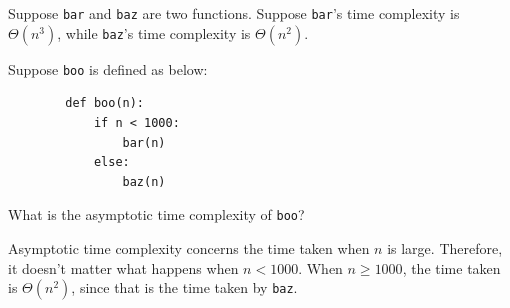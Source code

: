 \begin{prob}
    Suppose \texttt{bar} and \texttt{baz} are two functions.
    Suppose \texttt{bar}'s time complexity is $\Theta(n^3)$, while \texttt{baz}'s
    time complexity is $\Theta(n^2)$.

    Suppose \texttt{boo} is defined as below:

    \begin{verbatim}
        def boo(n):
            if n < 1000:
                bar(n)
            else:
                baz(n)
    \end{verbatim}

    What is the asymptotic time complexity of \texttt{boo}?


    \begin{soln}
        Asymptotic time complexity concerns the time taken when $n$ is large.
        Therefore, it doesn't matter what happens when $n < 1000$.
        When $n \geq 1000$, the time taken is $\Theta(n^2)$, since that is the
        time taken by \texttt{baz}.
    \end{soln}
\end{prob}
